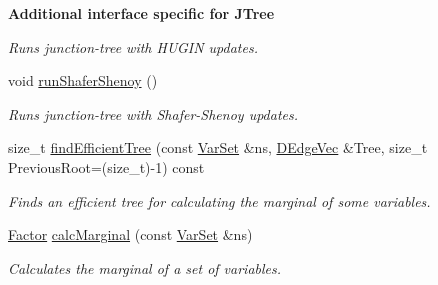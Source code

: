 \begin{Indent}{\bf Additional interface specific for JTree}
\begin{CompactItemize}
\begin{CompactList}\small\item\em Runs junction-tree with HUGIN updates. \item\end{CompactList}\item 
\hypertarget{classdai_1_1JTree_6d8ee4f30498985d0d434988dba8c258}{
void \hyperlink{classdai_1_1JTree_6d8ee4f30498985d0d434988dba8c258}{runShaferShenoy} ()}
\label{classdai_1_1JTree_6d8ee4f30498985d0d434988dba8c258}

\begin{CompactList}\small\item\em Runs junction-tree with Shafer-Shenoy updates. \item\end{CompactList}\item 
\hypertarget{classdai_1_1JTree_0ee81ed10535369928ba0abb3c1f7e02}{
size\_\-t \hyperlink{classdai_1_1JTree_0ee81ed10535369928ba0abb3c1f7e02}{findEfficientTree} (const \hyperlink{classdai_1_1VarSet}{VarSet} \&ns, \hyperlink{namespacedai_e7764251ab4d4b2d4fbec214eac83079}{DEdgeVec} \&Tree, size\_\-t PreviousRoot=(size\_\-t)-1) const }
\label{classdai_1_1JTree_0ee81ed10535369928ba0abb3c1f7e02}

\begin{CompactList}\small\item\em Finds an efficient tree for calculating the marginal of some variables. \item\end{CompactList}\item 
\hypertarget{classdai_1_1JTree_2ffd2a47a85b81efbbb5f0cfd7a083fa}{
\hyperlink{classdai_1_1TFactor}{Factor} \hyperlink{classdai_1_1JTree_2ffd2a47a85b81efbbb5f0cfd7a083fa}{calcMarginal} (const \hyperlink{classdai_1_1VarSet}{VarSet} \&ns)}
\label{classdai_1_1JTree_2ffd2a47a85b81efbbb5f0cfd7a083fa}

\begin{CompactList}\small\item\em Calculates the marginal of a set of variables. \item\end{CompactList}\end{CompactItemize}
\end{Indent}
